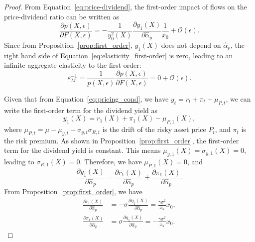 \begin{proof}
	From Equation~\eqref{eq:price-dividend}, the first-order impact of flows on the price-dividend ratio can be written as
	\begin{equation}\label{eq:elasticity_first-order}
	\frac{\partial p(X,\epsilon)}{\partial F(X,\epsilon)} =-\frac{1}{y_0^2(X)}\frac{\partial y_1(X)}{\partial\hat{\alpha}_p}\frac{1}{x_0} 
	+ \mathcal{O}(\epsilon).
	\end{equation}
	Since from Proposition~\ref{prop:first_order}, $ y_1(X) $ does not depend on $ \hat{\alpha}_p $, the right hand side of Equation~\eqref{eq:elasticity_first-order} is zero, leading to an infinite aggregate elasticity to the first-order:
	\[\varepsilon_M^{-1}=\frac{1}{p(X,\epsilon)}\frac{\partial p(X,\epsilon)}{\partial F(X,\epsilon)}=0+ \mathcal{O}(\epsilon).\]
	
	Given that from Equation~\eqref{eq:pricing_cond}, we have $ y_t=r_t+\pi_t-\mu_{P,t} $, we can write the first-order term for the dividend yield as
	\[y_1(X)=r_1(X)+\pi_1(X)-\mu_{P,1}(X),\]
	where $ \mu_{P,t}=\mu-\mu_{y,t}-\sigma_{y,t}\sigma_{R,t} $ is the drift of the risky asset price $ P_t $, and $ \pi_t $ is the risk premium.
	As shown in Proposition~\ref{prop:first_order}, the first-order term for the dividend yield is constant. This means $ \mu_{y,1}(X)=\sigma_{y,1}(X)=0 $, leading to $ \sigma_{R,1}(X)=0 $. Therefore, we have $ \mu_{P,1}(X)=0 $, and
	\[\frac{\partial y_1(X)}{\partial\hat{\alpha}_p}=\frac{\partial r_1(X)}{\partial\hat{\alpha}_p}+\frac{\partial \pi_1(X)}{\partial\hat{\alpha}_p}.\]
	From Proposition~\ref{prop:first_order}, we have
	\begin{align*}
		\frac{\partial r_1(X)}{\partial\hat{\alpha}_p}&=-\sigma\frac{\partial \eta_1(X)}{\partial\hat{\alpha}_p}=\frac{\gamma\sigma^2}{x_u}x_0,\\
		\frac{\partial \pi_1(X)}{\partial\hat{\alpha}_p}&=\sigma\frac{\partial \eta_1(X)}{\partial\hat{\alpha}_p}=-\frac{\gamma\sigma^2}{x_u}x_0.
	\end{align*}
	

\end{proof}
